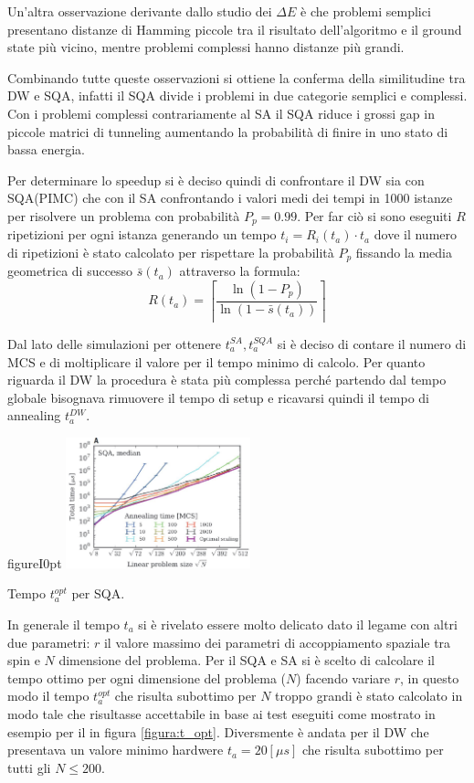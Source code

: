 Un'altra osservazione derivante dallo studio dei $\Delta E$ è che problemi semplici presentano distanze di Hamming piccole tra il risultato dell'algoritmo e il ground state più vicino, mentre problemi complessi hanno distanze più grandi.

Combinando tutte queste osservazioni si ottiene la conferma della similitudine tra DW e SQA, infatti il SQA divide i problemi in due categorie semplici e complessi. Con i problemi complessi contrariamente al SA il SQA riduce i grossi gap in piccole matrici di tunneling aumentando la probabilità di finire in uno stato di bassa energia.

\cite{DDQS}Per determinare lo speedup si è deciso quindi di confrontare il DW sia con SQA(PIMC) che con il SA confrontando i valori medi dei tempi in 1000 istanze per risolvere un problema con probabilità $P_p=0.99$.
Per far ciò si sono eseguiti $R$ ripetizioni per ogni istanza generando un tempo $t_i = R_i(t_a) \cdot t_a$ dove il numero di ripetizioni è stato calcolato per rispettare la probabilità $P_p$ fissando la media geometrica di successo $\bar{s}(t_a)$ attraverso la formula:
$$R(t_a) = \left\lceil\frac{\ln(1 - P_p)}{\ln(1 - \bar{s}(t_a))}\right\rceil$$

Dal lato delle simulazioni per ottenere $t_a^{SA}, t_a^{SQA}$ si è deciso di contare il numero di MCS e di moltiplicare il valore per il tempo minimo di calcolo.
Per quanto riguarda il DW la procedura è stata più complessa perché partendo dal tempo globale bisognava rimuovere il tempo di setup e ricavarsi quindi il tempo di annealing $t_a^{DW}$.

\begin{wrapfloat}{figure}{I}{0pt}
\includegraphics[width=0.4\textwidth]{Immagini/t_opt.jpg}
\caption{Tempo $t_a^{opt}$ per SQA.}
\label{figura:t_opt}
\end{wrapfloat}

In generale il tempo $t_a$ si è rivelato essere molto delicato dato il legame con altri due parametri: $r$ il valore massimo dei parametri di accoppiamento spaziale tra spin e $N$ dimensione del problema.
Per il SQA e SA si è scelto di calcolare il tempo ottimo per ogni dimensione del problema ($N$) facendo variare $r$, in questo modo il tempo $t_a^{opt}$ che risulta subottimo per $N$ troppo grandi è stato calcolato in modo tale che risultasse accettabile in base ai test eseguiti come mostrato in esempio per il in figura \ref{figura:t_opt}. Diversmente è andata per il DW che presentava un valore minimo hardwere $t_a = 20 [\mu s]$ che risulta subottimo per tutti gli $N \le 200$.

